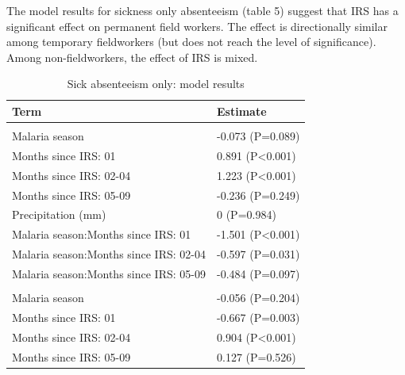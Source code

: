 \documentclass[]{article}
\begin{document}
The model results for sickness only absenteeism (table 5) suggest that
IRS has a significant effect on permanent field workers. The effect is
directionally similar among temporary fieldworkers (but does not reach
the level of significance). Among non-fieldworkers, the effect of IRS is
mixed.

\begin{table}

\caption{\label{tab:unnamed-chunk-29}Sick absenteeism only: model results}
\centering
\begin{tabular}[t]{ll}
\toprule
Term & Estimate\\
\midrule
\addlinespace[1.5em]
\multicolumn{2}{l}{\textbf{Permanent field worker}}\\
\hspace{1em}Malaria season & -0.073 (P=0.089)\\
\hspace{1em}Months since IRS: 01 & 0.891 (P<0.001)\\
\hspace{1em}Months since IRS: 02-04 & 1.223 (P<0.001)\\
\hspace{1em}Months since IRS: 05-09 & -0.236 (P=0.249)\\
\hspace{1em}Precipitation (mm) & 0 (P=0.984)\\
\hspace{1em}Malaria season:Months since IRS: 01 & -1.501 (P<0.001)\\
\hspace{1em}Malaria season:Months since IRS: 02-04 & -0.597 (P=0.031)\\
\hspace{1em}Malaria season:Months since IRS: 05-09 & -0.484 (P=0.097)\\
\addlinespace[1.5em]
\multicolumn{2}{l}{\textbf{Permanent not field worker}}\\
\hspace{1em}Malaria season & -0.056 (P=0.204)\\
\hspace{1em}Months since IRS: 01 & -0.667 (P=0.003)\\
\hspace{1em}Months since IRS: 02-04 & 0.904 (P<0.001)\\
\hspace{1em}Months since IRS: 05-09 & 0.127 (P=0.526)\\

\end{tabular}
\end{table}
\end{document}
